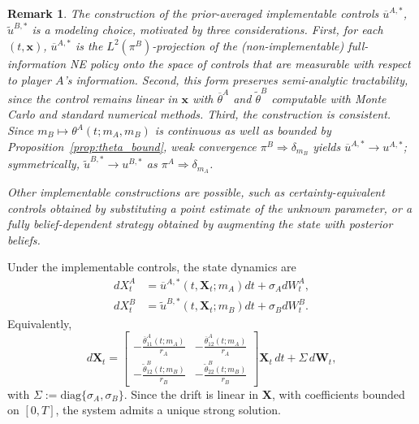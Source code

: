 \documentclass[letterpaper, 10 pt, conference]{ieeeconf}
\newcommand{\diag}{\mathrm{diag}}
\newtheorem{remark}{Remark}
\begin{document}
\begin{remark}\label{rem:interp_imp_cntrl} 
The construction of the prior-averaged implementable controls $\overline{u}^{A,\ast}$, $\widetilde{u}^{B,\ast}$ is a modeling choice, motivated by three considerations.  First, for each $(t,\bm{x})$, $\overline{u}^{A,\ast}$ is the $L^2(\pi^B)$-projection of the (non-implementable) full-information NE policy onto the space of controls that are measurable with respect to player $A$'s information.  Second, this form preserves semi-analytic tractability, since the control remains linear in $\bm{x}$ with $\overline{\theta}^A$ and $\widetilde{\theta}^B$ computable with  Monte Carlo and standard numerical methods.  Third, the construction is consistent.  Since $m_B \mapsto \theta^A(t;m_A,m_B)$ is continuous as well as
bounded by Proposition~\ref{prop:theta_bound}, weak convergence
$\pi^B \Rightarrow \delta_{m_B}$ yields
$\overline{u}^{A,\ast}\to u^{A,\ast}$; symmetrically,
$\widetilde{u}^{B,\ast}\to u^{B,\ast}$ as $\pi^A \Rightarrow \delta_{m_A}$. 

Other implementable constructions are possible, such as certainty-equivalent controls obtained by substituting a point estimate of the unknown parameter, or a fully belief-dependent strategy obtained by augmenting the state with posterior beliefs.
\end{remark}

Under the implementable controls, the state dynamics are
\begin{equation}
\label{eq:baseline_dynamics}    
\begin{aligned}
    dX_t^A &= \overline{u}^{A,\ast}(t, \bm X_t; m_A) dt + \sigma_A dW_t^A, \\
    dX_t^B &= \widetilde{u}^{B,\ast}(t, \bm X_t; m_B) dt + \sigma_B dW_t^B.  
\end{aligned}
\end{equation}
Equivalently, 
\begin{equation} \label{eq:strong_impl_dyn}  
    d\bm{X}_t = \begin{bmatrix}  -\frac{\overline{\theta}_{11}^A(t; m_A)}{r_A} & -\frac{\overline{\theta}_{12}^A(t; m_A)}{r_A} \\ -\frac{\widetilde{\theta}_{12}^B(t; m_B)}{r_B} & -\frac{\widetilde{\theta}_{22}^B(t; m_B)}{r_B} \end{bmatrix} \bm{X}_t \, dt + \Sigma \, d\bm{W}_t,
\end{equation}
with $\Sigma := \diag\{\sigma_A, \sigma_B\}$. Since the drift is linear in $\bm X$, with coefficients bounded on $[0,T]$, the system admits a unique strong solution.
\end{document}
